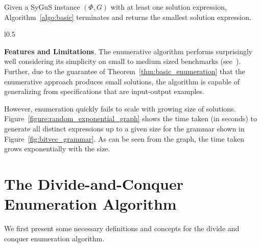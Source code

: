 \documentclass{llncs}
\newcommand\Spec{\Phi}
\newcommand\Grammar{G}
\renewcommand{\paragraph}[1]{\par\noindent\textbf{#1}.}
\begin{document}
\begin{theorem}
  \label{thm:basic_enumeration}
  Given a SyGuS instance $(\Spec, \Grammar)$ with at least one solution
  expression, Algorithm~\ref{algo:basic} terminates and returns the
  smallest solution expression.
\end{theorem}

\begin{wrapfigure}{l}{0.5\textwidth}
\centering
{}
\caption{Scalability of Enumeration}
\label{figure:random_exponential_graph}
\end{wrapfigure}
\paragraph{Features and Limitations}
The enumerative algorithm performs surprisingly well considering its
simplicity on small to medium sized benchmarks
(see~\cite{udupa-transit,udupa-sygus}).
Further, due to the guarantee of Theorem~\ref{thm:basic_enumeration}
that the enumerative approach produces small solutions, the algorithm is
capable of generalizing from specifications that are input-output
examples.

However, enumeration quickly fails to scale with growing size of
solutions.
Figure~\ref{figure:random_exponential_graph} shows the time taken (in seconds) to
generate all distinct expressions up to a given size for the grammar
shown in Figure~\ref{fig:bitvec_grammar}.
As can be seen from the graph, the time taken grows exponentially with
the size.



\section{The Divide-and-Conquer Enumeration Algorithm}
\label{sec:algo}

We first present some necessary definitions and concepts for the divide
and conquer enumeration algorithm.
\end{document}
